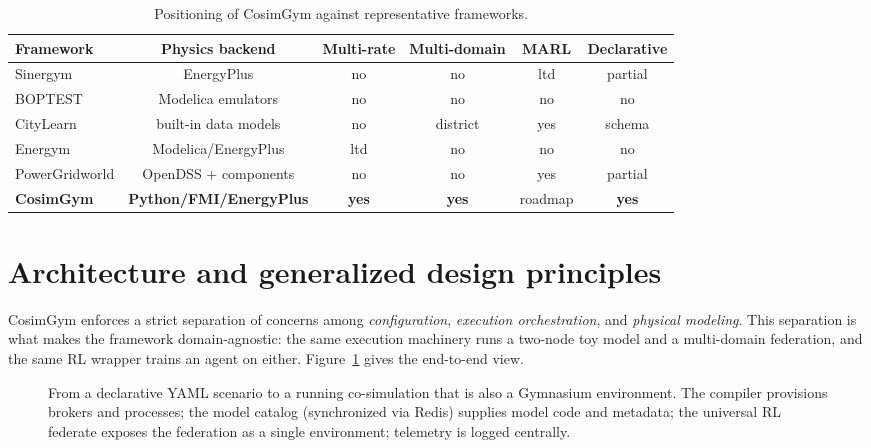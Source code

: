 \documentclass[preprint,12pt]{elsarticle}
\begin{document}
\begin{table}[t]\centering
\caption{Positioning of CosimGym against representative frameworks.}
\label{tab:compare}
\small
\begin{tabular}{@{}lccccc@{}}
\toprule
Framework & Physics backend & Multi-rate & Multi-domain & MARL & Declarative \\
\midrule
Sinergym       & EnergyPlus           & no  & no  & ltd & partial \\
BOPTEST        & Modelica emulators   & no  & no  & no  & no \\
CityLearn      & built-in data models & no  & district & yes & schema \\
Energym        & Modelica/EnergyPlus  & ltd & no  & no  & no \\
PowerGridworld & OpenDSS + components & no  & no  & yes & partial \\
\textbf{CosimGym} & \textbf{Python/FMI/EnergyPlus} & \textbf{yes} & \textbf{yes} & roadmap & \textbf{yes} \\
\bottomrule
\end{tabular}
\end{table}

\section{Architecture and generalized design principles}\label{sec:arch}
CosimGym enforces a strict separation of concerns among \emph{configuration},
\emph{execution orchestration}, and \emph{physical modeling}. This separation is
what makes the framework domain-agnostic: the same execution machinery runs a
two-node toy model and a multi-domain federation, and the same RL wrapper trains an
agent on either. Figure~\ref{fig:arch} gives the end-to-end view.

\begin{figure}[t]\centering
\caption{From a declarative YAML scenario to a running co-simulation that is also a
Gymnasium environment. The compiler provisions brokers and processes; the model
catalog (synchronized via Redis) supplies model code and metadata; the universal RL
federate exposes the federation as a single environment; telemetry is logged
centrally.}
\label{fig:arch}
\end{figure}
\end{document}
